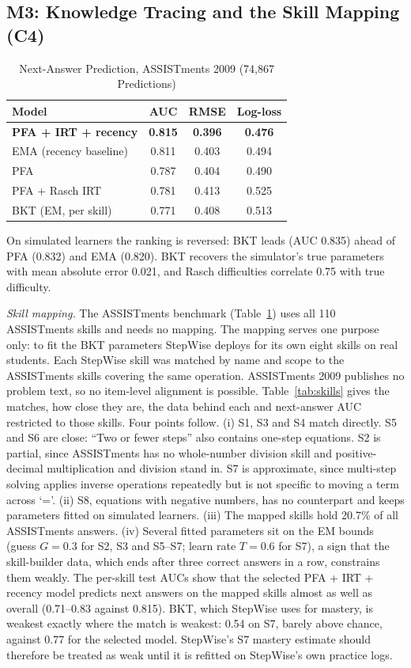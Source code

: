 \documentclass[conference]{IEEEtran}
\begin{document}
\subsection{M3: Knowledge Tracing and the Skill Mapping (C4)}
\begin{table}[!t]
\caption{Next-Answer Prediction, ASSISTments 2009 (74,867 Predictions)}
\label{tab:kt}
\centering
\footnotesize
\begin{tabular}{lccc}
\toprule
Model & AUC & RMSE & Log-loss\\
\midrule
\textbf{PFA + IRT + recency} & \textbf{0.815} & \textbf{0.396} & \textbf{0.476}\\
EMA (recency baseline) & 0.811 & 0.403 & 0.494\\
PFA & 0.787 & 0.404 & 0.490\\
PFA + Rasch IRT & 0.781 & 0.413 & 0.525\\
BKT (EM, per skill) & 0.771 & 0.408 & 0.513\\
\bottomrule
\end{tabular}
\end{table}

On simulated learners the ranking is reversed: BKT leads (AUC 0.835) ahead of PFA (0.832) and EMA (0.820). BKT recovers the simulator's true parameters with mean absolute error 0.021, and Rasch difficulties correlate 0.75 with true difficulty.

\textit{Skill mapping.} The ASSISTments benchmark (Table~\ref{tab:kt}) uses all 110 ASSISTments skills and needs no mapping. The mapping serves one purpose only: to fit the BKT parameters StepWise deploys for its own eight skills on real students. Each StepWise skill was matched by name and scope to the ASSISTments skills covering the same operation. ASSISTments 2009 publishes no problem text, so no item-level alignment is possible. Table~\ref{tab:skills} gives the matches, how close they are, the data behind each and next-answer AUC restricted to those skills. Four points follow. (i) S1, S3 and S4 match directly. S5 and S6 are close: ``Two or fewer steps'' also contains one-step equations. S2 is partial, since ASSISTments has no whole-number division skill and positive-decimal multiplication and division stand in. S7 is approximate, since multi-step solving applies inverse operations repeatedly but is not specific to moving a term across `='. (ii) S8, equations with negative numbers, has no counterpart and keeps parameters fitted on simulated learners. (iii) The mapped skills hold 20.7\% of all ASSISTments answers. (iv) Several fitted parameters sit on the EM bounds (guess $G=0.3$ for S2, S3 and S5--S7; learn rate $T=0.6$ for S7), a sign that the skill-builder data, which ends after three correct answers in a row, constrains them weakly. The per-skill test AUCs show that the selected PFA + IRT + recency model predicts next answers on the mapped skills almost as well as overall (0.71--0.83 against 0.815). BKT, which StepWise uses for mastery, is weakest exactly where the match is weakest: 0.54 on S7, barely above chance, against 0.77 for the selected model. StepWise's S7 mastery estimate should therefore be treated as weak until it is refitted on StepWise's own practice logs.
\end{document}
